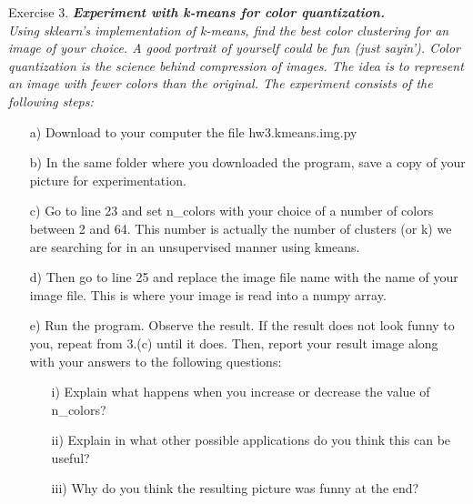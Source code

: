 \documentclass[12pt]{article}
\newenvironment{exercise}[1][]{%
  \bigskip                          %
  \noindent \textsf{Exercise #1.}\slshape }{}
\begin{document}
\begin{exercise}[3] %
  \textbf{Experiment with k-means for color quantization.} \\
  Using sklearn’s implementation of k-means, find the best color 
  clustering for an image of your choice. A good portrait of yourself 
  could be fun (just sayin’). Color quantization is the science behind 
  compression of images. The idea is to represent an image with 
  fewer colors than the original. The experiment consists of the 
  following steps:
  \begin{enumerate}
    \item[a)] Download to your computer the file hw3.kmeans.img.py
    \item[b)] In the same folder where you downloaded the program, 
    save a copy of your picture for experimentation.\item[c)] Go to line 23 and set n\_colors with your choice of a number of colors between 2 and 64. This
    number is actually the number of clusters (or k) we are searching for in an unsupervised manner
    using kmeans.
    \item[d)]  Then go to line 25 and replace the image file name with the name of your image file. This is
    where your image is read into a numpy array.
    \item[e)] Run the program. Observe the result. If the result does not look funny to you, repeat from 3.(c)
    until it does. Then, report your result image along with your answers to the following questions:
    \begin{enumerate}
      \item[i)] Explain what happens when you increase or decrease the value of n\_colors?
      \item[ii)] Explain in what other possible applications do you think this can be useful?
      \item[iii)] Why do you think the resulting picture was funny at the end?
    \end{enumerate}
  \end{enumerate}
\end{exercise}
   
\end{document}
